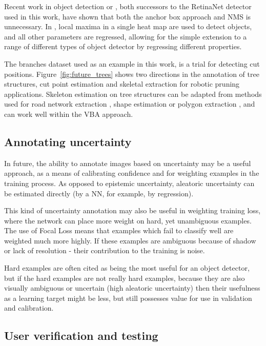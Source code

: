 Recent work in object detection \cite{Zhou2019} or \cite{Law2018}, both successors to the RetinaNet detector \cite{Wang2017} used in this work, have shown that both the anchor box approach and \gls{NMS} is unnecessary. In \cite{Zhou2019}, local maxima in a single heat map are used to detect objects, and all other parameters are regressed, allowing for the simple extension to a range of different types of object detector by regressing different properties.

The branches dataset used as an example in this work, is a trial for detecting cut positions. Figure~\ref{fig:future_trees} shows two directions in the annotation of tree structures, cut point estimation and skeletal extraction for robotic pruning applications. Skeleton estimation on tree structures can be adapted from methods used for road network extraction \cite{Li2018}, shape estimation \cite{Jiang2019a} or polygon extraction \cite{Acuna2018}, and can work well within the \gls{VBA} approach.

\subsection{Annotating uncertainty}

In future, the ability to annotate images based on uncertainty may be a useful approach, as a means of calibrating confidence and for weighting examples in the training process. As opposed to epistemic uncertainty, aleatoric uncertainty can be estimated directly (by a \gls{NN}, for example, by regression).  

This kind of uncertainty annotation may also be useful in weighting training loss, where the network can place more weight on hard, yet unambiguous examples. The use of Focal Loss means that examples which fail to classify well are weighted much more highly. If these examples are ambiguous because of shadow or lack of resolution - their contribution to the training is noise.

Hard examples are often cited as being the most useful for an object detector, but if the hard examples are not really hard examples, because they are also visually ambiguous or uncertain (high aleatoric uncertainty) then their usefulness as a learning target might be less, but still possesses value for use in validation and calibration.



\subsection{User verification and testing}
\label{sec:user_verification}

